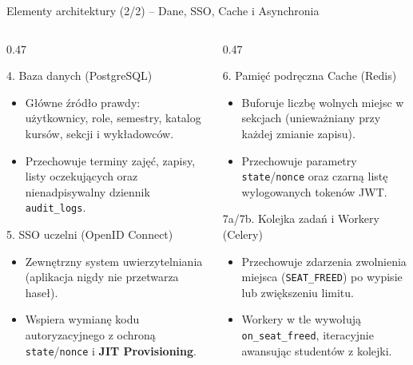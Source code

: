 \documentclass[aspectratio=169, 10pt, xcolor=table]{beamer}
\begin{document}
\begin{frame}{Elementy architektury (2/2) -- Dane, SSO, Cache i Asynchronia}
    \footnotesize
    \begin{columns}[T, onlytextwidth]
        \begin{column}{0.47\textwidth}
            \begin{block}{4. Baza danych (PostgreSQL)}
                \begin{itemize}
                    \item Główne źródło prawdy: użytkownicy, role, semestry, katalog kursów, sekcji i wykładowców.
                    \item Przechowuje terminy zajęć, zapisy, listy oczekujących oraz nienadpisywalny dziennik \texttt{audit\_logs}.
                \end{itemize}
            \end{block}
            \begin{block}{5. SSO uczelni (OpenID Connect)}
                \begin{itemize}
                    \item Zewnętrzny system uwierzytelniania (aplikacja nigdy nie przetwarza haseł).
                    \item Wspiera wymianę kodu autoryzacyjnego z ochroną \texttt{state}/\texttt{nonce} i \textbf{JIT Provisioning}.
                \end{itemize}
            \end{block}
        \end{column}
        \begin{column}{0.47\textwidth}
            \begin{block}{6. Pamięć podręczna Cache (Redis)}
                \begin{itemize}
                    \item Buforuje liczbę wolnych miejsc w sekcjach (unieważniany przy każdej zmianie zapisu).
                    \item Przechowuje parametry \texttt{state}/\texttt{nonce} oraz czarną listę wylogowanych tokenów JWT.
                \end{itemize}
            \end{block}
            \begin{block}{7a/7b. Kolejka zadań i Workery (Celery)}
                \begin{itemize}
                    \item Przechowuje zdarzenia zwolnienia miejsca (\texttt{SEAT\_FREED}) po wypisie lub zwiększeniu limitu.
                    \item Workery w tle wywołują \texttt{on\_seat\_freed}, iteracyjnie awansując studentów z kolejki.
                \end{itemize}
            \end{block}
        \end{column}
    \end{columns}
\end{frame}
\end{document}
